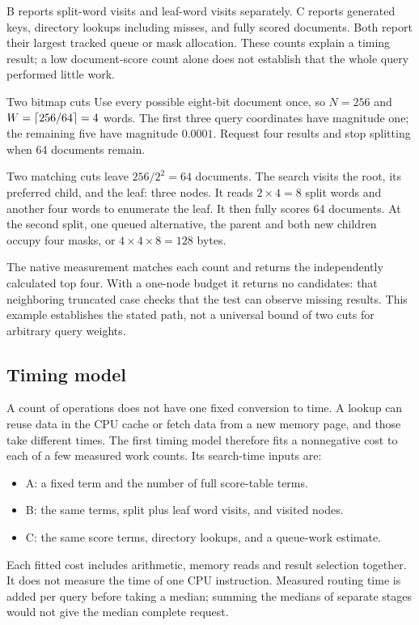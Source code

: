 B reports split-word visits and leaf-word visits separately. C reports generated keys, directory
lookups including misses, and fully scored documents. Both report their largest tracked queue
or mask allocation. These counts explain a timing result; a low document-score count alone does
not establish that the whole query performed little work.

\begin{examplebox}{Two bitmap cuts}
Use every possible eight-bit document once, so $N=256$ and $W=\left\lceil 256/64\right\rceil=4$ words.
The first three query coordinates have magnitude one; the remaining five have magnitude
$0.0001$. Request four results and stop splitting when 64 documents remain.

Two matching cuts leave $256/2^2=64$ documents. The search visits the root, its preferred child,
and the leaf: three nodes. It reads $2\times4=8$ split words and another four words to enumerate
the leaf. It then fully scores 64 documents. At the second split, one queued alternative,
the parent and both new children occupy four masks, or $4\times4\times8=128$ bytes.

The native measurement matches each count and returns the independently calculated top four.
With a one-node budget it returns no candidates: that neighboring truncated case checks that
the test can observe missing results. This example establishes the stated path, not a universal
bound of two cuts for arbitrary query weights.
\end{examplebox}

\subsection{Timing model}
A count of operations does not have one fixed conversion to time. A lookup can reuse data
in the CPU cache or fetch data from a new memory page, and those take different times.
The first timing model therefore fits a nonnegative cost to each of a few measured work counts. Its search-time inputs are:
\begin{itemize}
\item A: a fixed term and the number of full score-table terms.
\item B: the same terms, split plus leaf word visits, and visited nodes.
\item C: the same score terms, directory lookups, and a queue-work estimate.
\end{itemize}
Each fitted cost includes arithmetic, memory reads and result selection together. It does
not measure the time of one CPU instruction. Measured routing time is added per query before taking
a median; summing the medians of separate stages would not give the median complete request.

